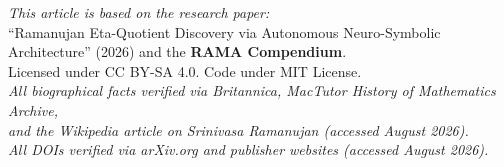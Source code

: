 \documentclass[11pt,a4paper]{article}
\begin{document}
\vspace{1em}
\begin{center}
\small\textit{This article is based on the research paper:}\\
\small``Ramanujan Eta-Quotient Discovery via Autonomous Neuro-Symbolic Architecture'' (2026) and the \textbf{RAMA Compendium}.\\
\small Licensed under CC BY-SA 4.0. Code under MIT License.\\
\smallskip
\small\textit{All biographical facts verified via Britannica, MacTutor History of Mathematics Archive,}\\
\small\textit{and the Wikipedia article on Srinivasa Ramanujan (accessed August 2026).}\\
\small\textit{All DOIs verified via arXiv.org and publisher websites (accessed August 2026).}
\end{center}
\end{document}
